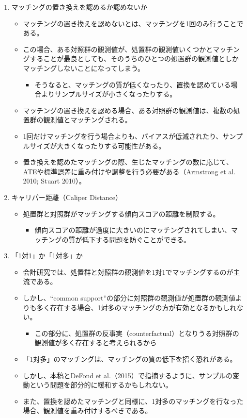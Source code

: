 \begin{enumerate}
 \item マッチングの置き換えを認めるか認めないか
   \begin{itemize}
    \item マッチングの置き換えを認めないとは、マッチングを1回のみ行うことである。
    \item この場合、ある対照群の観測値が、処置群の観測値いくつかとマッチングすることが最良としても、そのうちのひとつの処置群の観測値としかマッチングしないことになってしまう。
    \begin{itemize}
     \item そうなると、マッチングの質が低くなったり、置換を認めている場合よりサンプルサイズが小さくなったりする。
    \end{itemize}
    \item マッチングの置き換えを認める場合、ある対照群の観測値は、複数の処置群の観測値とマッチングされる。
    \item 1回だけマッチングを行う場合よりも、バイアスが低減されたり、サンプルサイズが大きくなったりする可能性がある。
    \item 置き換えを認めたマッチングの際、生じたマッチングの数に応じて、ATEや標準誤差に重み付けや調整を行う必要がある（Armstrong et al. 2010; Stuart 2010）。
   \end{itemize}
 \item キャリパー距離（Caliper Distance）
   \begin{itemize}
    \item 処置群と対照群がマッチングする傾向スコアの距離を制限する。
     \begin{itemize}
      \item 傾向スコアの距離が過度に大きいのにマッチングされてしまい、マッチングの質が低下する問題を防ぐことができる。
    \end{itemize}
   \end{itemize}
 \item 「1対1」か「1対多」か
   \begin{itemize}
    \item 会計研究では、処置群と対照群の観測値を1対1でマッチングするのが主流である。
    \item しかし、“common support”の部分に対照群の観測値が処置群の観測値よりも多く存在する場合、1対多のマッチングの方が有効となるかもしれない。
     \begin{itemize}    
      \item この部分に、処置群の反事実（counterfactual）となりうる対照群の観測値が多く存在すると考えられるから
     \end{itemize}
    \item 「1対多」のマッチングは、マッチングの質の低下を招く恐れがある。
    \item しかし、本稿とDeFond et al.（2015）で指摘するように、サンプルの変動という問題を部分的に緩和するかもしれない。
    \item また、置換を認めたマッチングと同様に、1対多のマッチングを行なった場合、観測値を重み付けするべきである。
   \end{itemize}
\end{enumerate}


